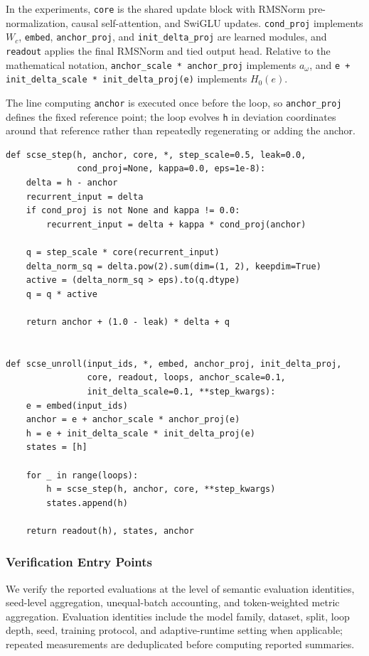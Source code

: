 \documentclass[letterpaper]{article} %
\newcommand{\SCSE}{\textsc{SCSE}}
\theoremstyle{remark}
\begin{document}
In the experiments, \texttt{core} is the shared update block with RMSNorm pre-normalization, causal self-attention, and SwiGLU updates.  \texttt{cond\_proj} implements $W_c$, \texttt{embed}, \texttt{anchor\_proj}, and \texttt{init\_delta\_proj} are learned modules, and \texttt{readout} applies the final RMSNorm and tied output head.  Relative to the mathematical notation, \texttt{anchor\_scale * anchor\_proj} implements $a_\omega$, and \texttt{e + init\_delta\_scale * init\_delta\_proj(e)} implements $H_0(e)$.

The line computing \texttt{anchor} is executed once before the loop, so \texttt{anchor\_proj} defines the fixed reference point; the loop evolves \texttt{h} in deviation coordinates around that reference rather than repeatedly regenerating or adding the anchor.

\begin{lstlisting}[style=pythoncode,float=t!,caption={PyTorch code for \SCSE{}.  Set \texttt{cond\_proj=None}, \texttt{kappa=0}, and \texttt{leak=0} for \SCSE{}; for the secondary leak diagnostic, set \texttt{leak=0.02}, let \texttt{cond\_proj} implement $W_c$, and supply that diagnostic's learned scalar gain $\kappa$, initialized to the same configured value as the baseline's learned gain $\alpha$.},label={lst:scse-code}]
def scse_step(h, anchor, core, *, step_scale=0.5, leak=0.0,
              cond_proj=None, kappa=0.0, eps=1e-8):
    delta = h - anchor
    recurrent_input = delta
    if cond_proj is not None and kappa != 0.0:
        recurrent_input = delta + kappa * cond_proj(anchor)

    q = step_scale * core(recurrent_input)
    delta_norm_sq = delta.pow(2).sum(dim=(1, 2), keepdim=True)
    active = (delta_norm_sq > eps).to(q.dtype)
    q = q * active

    return anchor + (1.0 - leak) * delta + q


def scse_unroll(input_ids, *, embed, anchor_proj, init_delta_proj,
                core, readout, loops, anchor_scale=0.1,
                init_delta_scale=0.1, **step_kwargs):
    e = embed(input_ids)
    anchor = e + anchor_scale * anchor_proj(e)
    h = e + init_delta_scale * init_delta_proj(e)
    states = [h]

    for _ in range(loops):
        h = scse_step(h, anchor, core, **step_kwargs)
        states.append(h)

    return readout(h), states, anchor
\end{lstlisting}

\subsubsection{Verification Entry Points}
\label{app:verification-entry-points}
We verify the reported evaluations at the level of semantic evaluation identities, seed-level aggregation, unequal-batch accounting, and token-weighted metric aggregation.  Evaluation identities include the model family, dataset, split, loop depth, seed, training protocol, and adaptive-runtime setting when applicable; repeated measurements are deduplicated before computing reported summaries.
\end{document}
